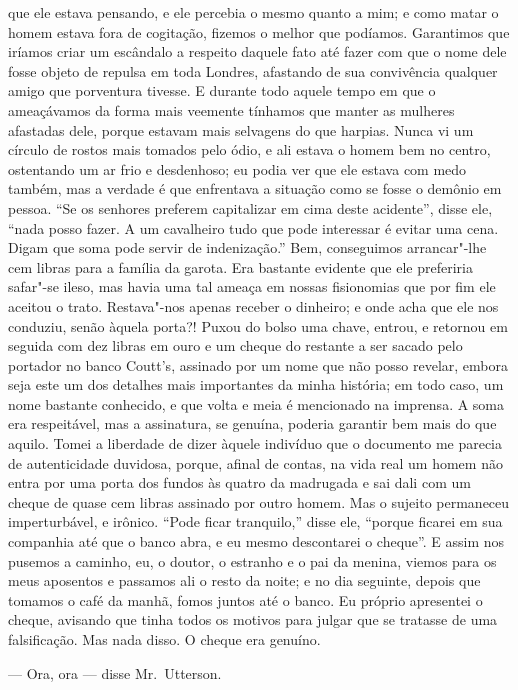 que ele estava pensando, e ele percebia o mesmo quanto a mim; e como
matar o homem estava fora de cogitação, fizemos o melhor que podíamos. 
Garantimos que iríamos criar um escândalo a respeito daquele fato até
fazer com que o nome dele fosse objeto de repulsa em toda Londres,
afastando de sua convivência qualquer amigo que porventura tivesse.  E
durante todo aquele tempo em que o ameaçávamos da forma mais veemente
tínhamos que manter as mulheres afastadas dele, porque estavam mais
selvagens do que harpias.  Nunca vi um círculo de rostos mais tomados
pelo ódio, e ali estava o homem bem no centro, ostentando um ar frio e
desdenhoso; eu podia ver que ele estava com medo também, mas a verdade
é que enfrentava a situação como se fosse o demônio em pessoa.  “Se os
senhores preferem capitalizar em cima deste acidente”, disse ele, “nada
posso fazer.  A um cavalheiro tudo que pode interessar é evitar uma
cena.  Digam que soma pode servir de indenização.”  Bem, conseguimos
arrancar"-lhe cem libras para a família da garota.  Era bastante
evidente que ele preferiria safar"-se ileso, mas havia uma tal ameaça em
nossas fisionomias que por fim ele aceitou o trato.  Restava"-nos apenas
receber o dinheiro; e onde acha que ele nos conduziu, senão àquela
porta?!  Puxou do bolso uma chave, entrou, e retornou em seguida com
dez libras em ouro e um cheque do restante a ser sacado pelo portador
no banco Coutt’s, assinado por um nome que não posso revelar, embora
seja este um dos detalhes mais importantes da minha história; em todo
caso, um nome bastante conhecido, e que volta e meia é mencionado na
imprensa.  A soma era respeitável, mas a assinatura, se genuína,
poderia garantir bem mais do que aquilo.  Tomei a liberdade de dizer
àquele indivíduo que o documento me parecia de autenticidade duvidosa,
porque, afinal de contas, na vida real um homem não entra por uma porta
dos fundos às quatro da madrugada e sai dali com um cheque de quase cem
libras assinado por outro homem.  Mas o sujeito permaneceu
imperturbável, e irônico.  “Pode ficar tranquilo,” disse ele, “porque
ficarei em sua companhia até que o banco abra, e eu mesmo descontarei o
cheque”.  E assim nos pusemos a caminho, eu, o doutor, o estranho e o
pai da menina, viemos para os meus aposentos e passamos ali o resto da
noite; e no dia seguinte, depois que tomamos o café da manhã, fomos
juntos até o banco.  Eu próprio apresentei o cheque, avisando que tinha
todos os motivos para julgar que se tratasse de uma falsificação.  Mas
nada disso.  O cheque era genuíno.

--- Ora, ora --- disse Mr.~Utterson. 

